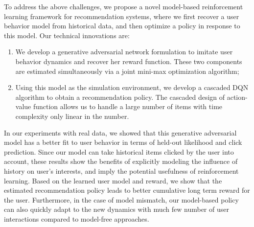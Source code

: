\documentclass{article} %
\newcommand{\Le}[1]{{\color{red}{\bf\sf [ #1]}}}
\newcommand{\shuang}[1]{{\color{purple}{\bf\sf[ #1]}}}
\begin{document}
To address the above challenges, we propose a novel model-based reinforcement learning framework for recommendation systems, where we first recover a user behavior model from historical data, and then optimize a policy in response to this model. Our technical innovations are:
\begin{enumerate}
    \item We develop a generative adversarial network formulation to imitate user behavior dynamics and recover her reward function. These two components are estimated simultaneously via a joint mini-max optimization algorithm; 
    \item Using this model as the simulation environment, we develop a cascaded DQN algorithm to obtain a recommendation policy. The cascaded design of action-value function allows us to handle a large number of items with time complexity only linear in the number. 
\end{enumerate}
In our experiments with real data, we showed that this generative adversarial model has a better fit to user behavior in terms of held-out likelihood and click prediction. Since our model can take historical items clicked by the user into account, these results show the benefits of explicitly modeling the influence of history on user's interests, and imply the potential usefulness of reinforcement learning. Based on the learned user model and reward, we show that the estimated recommendation policy leads to better cumulative long term reward for the user. Furthermore, in the case of model mismatch, our model-based policy can also quickly adapt to the new dynamics with much few number of user interactions compared to model-free approaches.    

\end{document}
